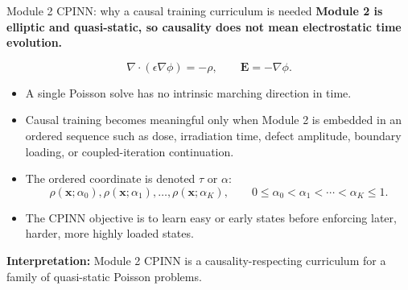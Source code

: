 \documentclass[aspectratio=169,10pt]{beamer}
\begin{document}
\begin{frame}{Module 2 CPINN: why a causal training curriculum is needed}
\small
\textbf{Module 2 is elliptic and quasi-static, so causality does not mean electrostatic time evolution.}

\vspace{0.25em}
\begin{equation*}
\nabla\cdot(\epsilon\nabla\phi)=-\rho,
\qquad
\mathbf E=-\nabla\phi.
\end{equation*}

\vspace{-0.1em}
\begin{itemize}
    \item A single Poisson solve has no intrinsic marching direction in time.
    \item Causal training becomes meaningful only when Module 2 is embedded in an ordered sequence such as dose, irradiation time, defect amplitude, boundary loading, or coupled-iteration continuation.
    \item The ordered coordinate is denoted $\tau$ or $\alpha$:
    \[
        \rho(\mathbf x;\alpha_0),\rho(\mathbf x;\alpha_1),\ldots,
        \rho(\mathbf x;\alpha_K),
        \qquad 0\leq \alpha_0<\alpha_1<\cdots<\alpha_K\leq1.
    \]
    \item The CPINN objective is to learn easy or early states before enforcing later, harder, more highly loaded states.
\end{itemize}

\vspace{0.1em}
\textbf{Interpretation:} Module 2 CPINN is a causality-respecting curriculum for a family of quasi-static Poisson problems.
\end{frame}
\end{document}
